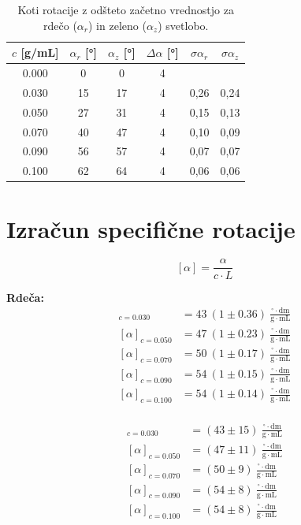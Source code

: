 \documentclass[a4paper,12pt]{article}
\begin{document}
\begin{table}[H]
\centering
\begin{tabular}{cccccc}
\toprule
$c$ [g/mL] & $\alpha_r$ [°] & $\alpha_z$ [°]  & $\Delta \alpha$ [°] & $\sigma \alpha_r$ & $\sigma \alpha_z$ \\
\midrule
0.000 & 0  & 0 & 4 &  \\
0.030 & 15 & 17 & 4 & 0,26 & 0,24 \\
0.050 & 27 & 31 & 4 & 0,15 & 0,13 \\
0.070 & 40 & 47 & 4 & 0,10 & 0,09 \\
0.090 & 56 & 57 & 4 & 0,07 & 0,07 \\
0.100 & 62 & 64 & 4 & 0,06 & 0,06 \\
\bottomrule
\end{tabular}
\caption{Koti rotacije z odšteto začetno vrednostjo za rdečo ($\alpha_r$) in zeleno ($\alpha_z$) svetlobo.}
\end{table}


\section*{Izračun specifične rotacije}
\[
[\alpha] = \frac{\alpha}{c \cdot L}
\]
\begin{minipage}{0.48\textwidth}
\textbf{Rdeča:}
\begin{align*}
[\alpha]_{c=0.030} &= 43 \ (1 \pm 0.36) \ \frac{^\circ \cdot \mathrm{dm}}{\mathrm{g} \cdot \mathrm{mL}}\\
[\alpha]_{c=0.050} &= 47 \ (1 \pm 0.23) \ \frac{^\circ \cdot \mathrm{dm}}{\mathrm{g} \cdot \mathrm{mL}}\\
[\alpha]_{c=0.070} &= 50 \ (1 \pm 0.17) \ \frac{^\circ \cdot \mathrm{dm}}{\mathrm{g} \cdot \mathrm{mL}}\\
[\alpha]_{c=0.090} &= 54 \ (1 \pm 0.15) \ \frac{^\circ \cdot \mathrm{dm}}{\mathrm{g} \cdot \mathrm{mL}}\\
[\alpha]_{c=0.100} &= 54 \ (1 \pm 0.14) \ \frac{^\circ \cdot \mathrm{dm}}{\mathrm{g} \cdot \mathrm{mL}}\\
\end{align*}
\end{minipage}
\hfill
\begin{minipage}{0.48\textwidth}

\begin{align*}
[\alpha]_{c=0.030} &= (43 \pm 15) \ \frac{^\circ \cdot \mathrm{dm}}{\mathrm{g} \cdot \mathrm{mL}} \\
[\alpha]_{c=0.050} &= (47 \pm 11) \ \frac{^\circ \cdot \mathrm{dm}}{\mathrm{g} \cdot \mathrm{mL}} \\
[\alpha]_{c=0.070} &= (50 \pm 9)  \ \frac{^\circ \cdot \mathrm{dm}}{\mathrm{g} \cdot \mathrm{mL}}\\
[\alpha]_{c=0.090} &= (54 \pm 8)  \ \frac{^\circ \cdot \mathrm{dm}}{\mathrm{g} \cdot \mathrm{mL}}\\
[\alpha]_{c=0.100} &= (54 \pm 8)  \ \frac{^\circ \cdot \mathrm{dm}}{\mathrm{g} \cdot \mathrm{mL}}\\
\end{align*}
\end{minipage}
\end{document}
